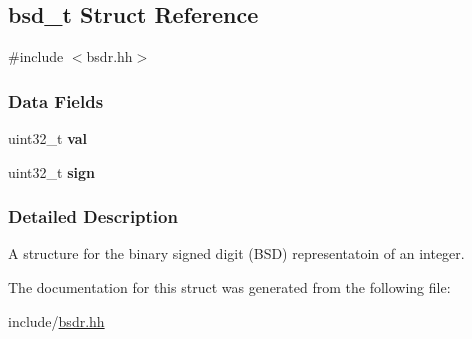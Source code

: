 \hypertarget{structbsd__t}{\subsection{bsd\-\_\-t \-Struct \-Reference}
\label{structbsd__t}
}


{\ttfamily \#include $<$bsdr.\-hh$>$}

\subsubsection*{\-Data \-Fields}
\begin{DoxyCompactItemize}
\item 
\hypertarget{structbsd__t_af977891f74895b89a3e8c7fc729de737}{uint32\-\_\-t {\bfseries val}}\label{structbsd__t_af977891f74895b89a3e8c7fc729de737}

\item 
\hypertarget{structbsd__t_a119507a57971a6c76f8b20c738e6b770}{uint32\-\_\-t {\bfseries sign}}\label{structbsd__t_a119507a57971a6c76f8b20c738e6b770}

\end{DoxyCompactItemize}


\subsubsection{\-Detailed \-Description}
\-A structure for the binary signed digit (\-B\-S\-D) representatoin of an integer. 

\-The documentation for this struct was generated from the following file\-:\begin{DoxyCompactItemize}
\item 
include/\hyperlink{bsdr_8hh}{bsdr.\-hh}\end{DoxyCompactItemize}
